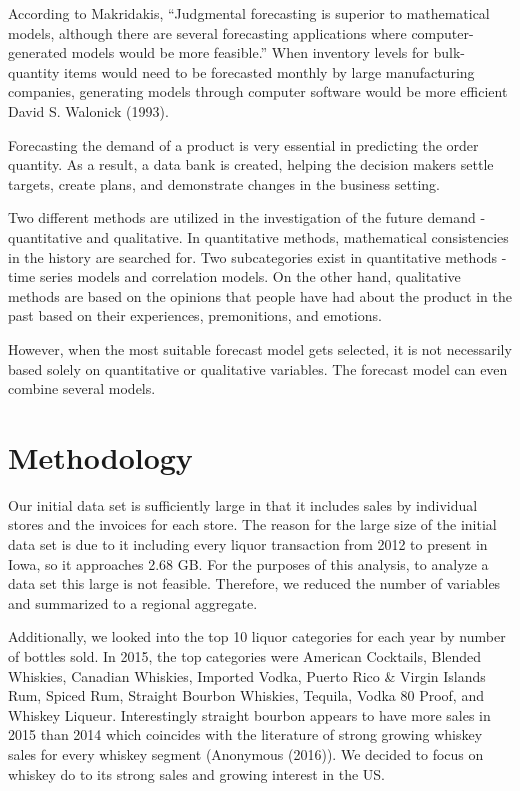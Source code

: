 \documentclass[]{elsarticle} %
\begin{document}
According to Makridakis, ``Judgmental forecasting is superior to
mathematical models, although there are several forecasting applications
where computer-generated models would be more feasible.'' When inventory
levels for bulk-quantity items would need to be forecasted monthly by
large manufacturing companies, generating models through computer
software would be more efficient David S. Walonick (1993).

Forecasting the demand of a product is very essential in predicting the
order quantity. As a result, a data bank is created, helping the
decision makers settle targets, create plans, and demonstrate changes in
the business setting.

Two different methods are utilized in the investigation of the future
demand - quantitative and qualitative. In quantitative methods,
mathematical consistencies in the history are searched for. Two
subcategories exist in quantitative methods - time series models and
correlation models. On the other hand, qualitative methods are based on
the opinions that people have had about the product in the past based on
their experiences, premonitions, and emotions.

However, when the most suitable forecast model gets selected, it is not
necessarily based solely on quantitative or qualitative variables. The
forecast model can even combine several models.

\section{Methodology}\label{methodology}

Our initial data set is sufficiently large in that it includes sales by
individual stores and the invoices for each store. The reason for the
large size of the initial data set is due to it including every liquor
transaction from 2012 to present in Iowa, so it approaches 2.68 GB. For
the purposes of this analysis, to analyze a data set this large is not
feasible. Therefore, we reduced the number of variables and summarized
to a regional aggregate.

Additionally, we looked into the top 10 liquor categories for each year
by number of bottles sold. In 2015, the top categories were American
Cocktails, Blended Whiskies, Canadian Whiskies, Imported Vodka, Puerto
Rico \& Virgin Islands Rum, Spiced Rum, Straight Bourbon Whiskies,
Tequila, Vodka 80 Proof, and Whiskey Liqueur. Interestingly straight
bourbon appears to have more sales in 2015 than 2014 which coincides
with the literature of strong growing whiskey sales for every whiskey
segment (Anonymous (2016)). We decided to focus on whiskey do to its
strong sales and growing interest in the US.
\end{document}

